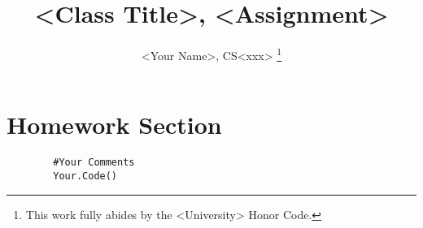 \documentclass{article}
\begin{document}
\begin{titlepage}

\title{<Class Title>, <Assignment>}
\author{<Your Name>, CS<xxx> \thanks{ This work fully abides by the <University> Honor Code.}}

\maketitle


\end{titlepage}
\section{Homework Section}

	\begin{lstlisting}
		#Your Comments
		Your.Code()
	\end{lstlisting}
\end{document}
